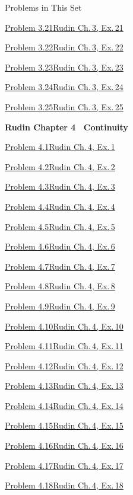 \documentclass[main.tex]{subfiles}
\begin{document}
\begin{lecturecontents}{Problems in This Set}
  \item \hyperlink{prob:3.21}{Problem 3.21\quad Rudin Ch.\,3, Ex.\,21}
  \item \hyperlink{prob:3.22}{Problem 3.22\quad Rudin Ch.\,3, Ex.\,22}
  \item \hyperlink{prob:3.23}{Problem 3.23\quad Rudin Ch.\,3, Ex.\,23}
  \item \hyperlink{prob:3.24}{Problem 3.24\quad Rudin Ch.\,3, Ex.\,24}
  \item \hyperlink{prob:3.25}{Problem 3.25\quad Rudin Ch.\,3, Ex.\,25}
  \item {\bfseries Rudin Chapter 4 \textendash\ Continuity}
  \item \hyperlink{prob:4.1}{Problem 4.1\quad Rudin Ch.\,4, Ex.\,1}
  \item \hyperlink{prob:4.2}{Problem 4.2\quad Rudin Ch.\,4, Ex.\,2}
  \item \hyperlink{prob:4.3}{Problem 4.3\quad Rudin Ch.\,4, Ex.\,3}
  \item \hyperlink{prob:4.4}{Problem 4.4\quad Rudin Ch.\,4, Ex.\,4}
  \item \hyperlink{prob:4.5}{Problem 4.5\quad Rudin Ch.\,4, Ex.\,5}
  \item \hyperlink{prob:4.6}{Problem 4.6\quad Rudin Ch.\,4, Ex.\,6}
  \item \hyperlink{prob:4.7}{Problem 4.7\quad Rudin Ch.\,4, Ex.\,7}
  \item \hyperlink{prob:4.8}{Problem 4.8\quad Rudin Ch.\,4, Ex.\,8}
  \item \hyperlink{prob:4.9}{Problem 4.9\quad Rudin Ch.\,4, Ex.\,9}
  \item \hyperlink{prob:4.10}{Problem 4.10\quad Rudin Ch.\,4, Ex.\,10}
  \item \hyperlink{prob:4.11}{Problem 4.11\quad Rudin Ch.\,4, Ex.\,11}
  \item \hyperlink{prob:4.12}{Problem 4.12\quad Rudin Ch.\,4, Ex.\,12}
  \item \hyperlink{prob:4.13}{Problem 4.13\quad Rudin Ch.\,4, Ex.\,13}
  \item \hyperlink{prob:4.14}{Problem 4.14\quad Rudin Ch.\,4, Ex.\,14}
  \item \hyperlink{prob:4.15}{Problem 4.15\quad Rudin Ch.\,4, Ex.\,15}
  \item \hyperlink{prob:4.16}{Problem 4.16\quad Rudin Ch.\,4, Ex.\,16}
  \item \hyperlink{prob:4.17}{Problem 4.17\quad Rudin Ch.\,4, Ex.\,17}
  \item \hyperlink{prob:4.18}{Problem 4.18\quad Rudin Ch.\,4, Ex.\,18}

\end{lecturecontents}
\end{document}
